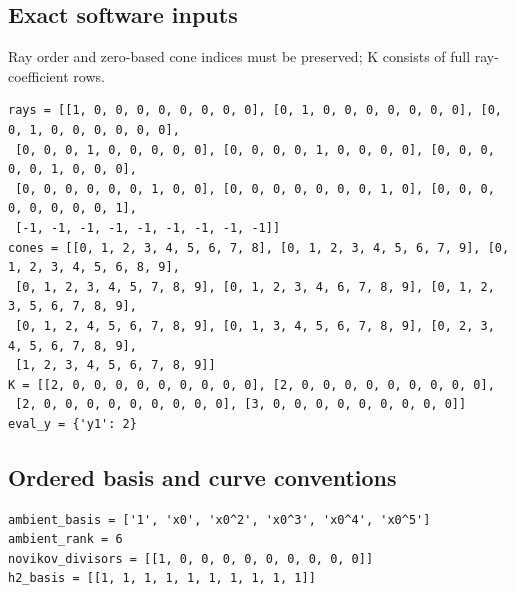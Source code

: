 \documentclass[10pt,a4paper]{article}
\begin{document}
\subsection*{Exact software inputs}
Ray order and zero-based cone indices must be preserved; K consists of full ray-coefficient rows.
\begin{lstlisting}
rays = [[1, 0, 0, 0, 0, 0, 0, 0, 0], [0, 1, 0, 0, 0, 0, 0, 0, 0], [0, 0, 1, 0, 0, 0, 0, 0, 0],
 [0, 0, 0, 1, 0, 0, 0, 0, 0], [0, 0, 0, 0, 1, 0, 0, 0, 0], [0, 0, 0, 0, 0, 1, 0, 0, 0],
 [0, 0, 0, 0, 0, 0, 1, 0, 0], [0, 0, 0, 0, 0, 0, 0, 1, 0], [0, 0, 0, 0, 0, 0, 0, 0, 1],
 [-1, -1, -1, -1, -1, -1, -1, -1, -1]]
cones = [[0, 1, 2, 3, 4, 5, 6, 7, 8], [0, 1, 2, 3, 4, 5, 6, 7, 9], [0, 1, 2, 3, 4, 5, 6, 8, 9],
 [0, 1, 2, 3, 4, 5, 7, 8, 9], [0, 1, 2, 3, 4, 6, 7, 8, 9], [0, 1, 2, 3, 5, 6, 7, 8, 9],
 [0, 1, 2, 4, 5, 6, 7, 8, 9], [0, 1, 3, 4, 5, 6, 7, 8, 9], [0, 2, 3, 4, 5, 6, 7, 8, 9],
 [1, 2, 3, 4, 5, 6, 7, 8, 9]]
K = [[2, 0, 0, 0, 0, 0, 0, 0, 0, 0], [2, 0, 0, 0, 0, 0, 0, 0, 0, 0],
 [2, 0, 0, 0, 0, 0, 0, 0, 0, 0], [3, 0, 0, 0, 0, 0, 0, 0, 0, 0]]
eval_y = {'y1': 2}
\end{lstlisting}
\subsection*{Ordered basis and curve conventions}
\begin{lstlisting}
ambient_basis = ['1', 'x0', 'x0^2', 'x0^3', 'x0^4', 'x0^5']
ambient_rank = 6
novikov_divisors = [[1, 0, 0, 0, 0, 0, 0, 0, 0, 0]]
h2_basis = [[1, 1, 1, 1, 1, 1, 1, 1, 1, 1]]
\end{lstlisting}
\end{document}
